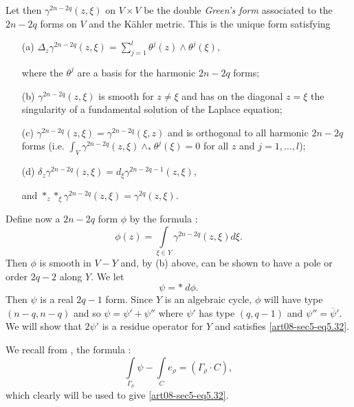 Let then $\gamma^{2n-2q}(z,\xi)$ on $V\times V$ be the double {\em Green's form} associated to the $2n-2q$ forms on $V$ and the K\"ahler metric. This is the unique form satisfying
\begin{itemize}
\item[(a)]\pageoriginale \hfill $\Delta_{z}\gamma^{2n-2q}(z,\xi)=\sum\limits^{l}_{j=1}\theta^{j}(z)\wedge \theta^{j}(\xi)$,\hfill\,

where the $\theta^{j}$ are a basis for the harmonic $2n-2q$ forms;

\item[(b)] $\gamma^{2n-2q}(z,\xi)$ is smooth for $z\neq\xi$ and has on the diagonal $z=\xi$ the singularity of a fundamental solution of the Laplace equation;

\item[(c)] $\gamma^{2n-2q}(z,\xi)=\gamma^{2n-2q}(\xi,z)$ and is orthogonal to all harmonic $2n-2q$ forms (i.e. $\int_{V}\gamma^{2n-2q}(z,\xi)\wedge_{*}\theta^{j}(\xi)=0$ for all $z$ and $j=1,\ldots,l$); 

\item[(d)] $\delta_{z}\gamma^{2n-2q}(z,\xi)=d_{\xi}\gamma^{2n-2q-1}(z,\xi)$, 

and $*_{z}*_{\xi}\gamma^{2n-2q}(z,\xi)=\gamma^{2q}(z,\xi)$.
\end{itemize}

Define now a $2n-2q$ form $\phi$ by the formula :
\begin{equation}
\phi(z)=\int\limits_{\xi\in Y}\gamma^{2n-2q}(z,\xi)d\xi.\label{art08-sec5-eq5.33}
\end{equation}
Then $\phi$ is smooth in $V-Y$ and, by (b) above, can be shown to have a pole or order $2q-2$ along $Y$. We let
\begin{equation}
\psi=* \ d\phi.\label{art08-sec5-eq5.34}
\end{equation}
Then $\psi$ is a real $2q-1$ form. Since $Y$ is an algebraic cycle, $\phi$ will have type $(n-q,n-q)$ and so $\psi=\psi'+\psi''$ where $\psi'$ has type $(q,q-1)$ and $\psi''=\overline{\psi}'$. We will show that $2\psi'$ is a residue operator for $Y$ and satisfies \eqref{art08-sec5-eq5.32}.

We recall from \cite{art08-key17}, the formula :
\begin{equation}
\int\limits_{\Gamma_{\rho}}\psi-\int\limits_{C}e_{\rho}=(\Gamma_{\rho}\cdot C),\label{art08-sec5-eq5.35}
\end{equation}
which clearly will be used to give \eqref{art08-sec5-eq5.32}.

